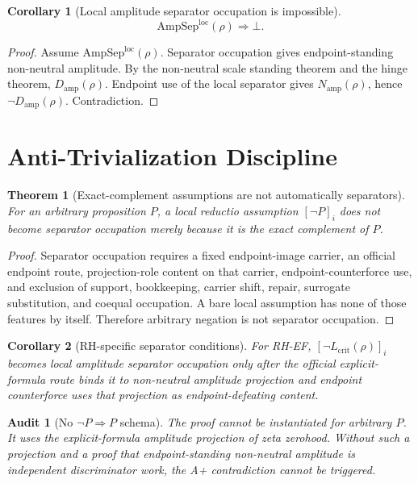 \documentclass[11pt]{article}
\newtheorem{theorem}{Theorem}[section]
\newtheorem{corollary}{Corollary}[section]
\newtheorem{audit}{Audit}[section]
\newcommand{\Lcrit}{L_{\mathrm{crit}}}
\newcommand{\AmpSepLoc}{\mathrm{AmpSep}^{\mathrm{loc}}}
\newcommand{\Damp}{D_{\mathrm{amp}}}
\newcommand{\Namp}{N_{\mathrm{amp}}}
\begin{document}
\begin{corollary}[Local amplitude separator occupation is impossible]
\[
\AmpSepLoc(\rho)\Rightarrow \bot.
\]
\end{corollary}

\begin{proof}
Assume \(\AmpSepLoc(\rho)\).  Separator occupation gives endpoint-standing non-neutral amplitude.  By the non-neutral scale standing theorem and the hinge theorem, \(\Damp(\rho)\).  Endpoint use of the local separator gives \(\Namp(\rho)\), hence \(\neg\Damp(\rho)\).  Contradiction.
\end{proof}

\section{Anti-Trivialization Discipline}

\begin{theorem}[Exact-complement assumptions are not automatically separators]
For an arbitrary proposition \(P\), a local reductio assumption \([\neg P]_i\) does not become separator occupation merely because it is the exact complement of \(P\).
\end{theorem}

\begin{proof}
Separator occupation requires a fixed endpoint-image carrier, an official endpoint route, projection-role content on that carrier, endpoint-counterforce use, and exclusion of support, bookkeeping, carrier shift, repair, surrogate substitution, and coequal occupation.  A bare local assumption has none of those features by itself.  Therefore arbitrary negation is not separator occupation.
\end{proof}

\begin{corollary}[RH-specific separator conditions]
For RH-EF, \([\neg\Lcrit(\rho)]_i\) becomes local amplitude separator occupation only after the official explicit-formula route binds it to non-neutral amplitude projection and endpoint counterforce uses that projection as endpoint-defeating content.
\end{corollary}

\begin{audit}[No \(\neg P\Rightarrow P\) schema]
The proof cannot be instantiated for arbitrary \(P\).  It uses the explicit-formula amplitude projection of zeta zerohood.  Without such a projection and a proof that endpoint-standing non-neutral amplitude is independent discriminator work, the A+ contradiction cannot be triggered.
\end{audit}
\end{document}
